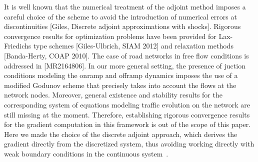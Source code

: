 It is well known that the numerical treatment of the adjoint method imposes a careful choice of the scheme to avoid the introduction of numerical errors  at discontinuities [Giles, Discrete adjoint approximations with shocks].
Rigorous convergence results for optimization problems have been provided  for Lax-Friedichs type schemes [Giles-Ulbrich, SIAM 2012] and relaxation methods [Banda-Herty, COAP 2010].
The case of road networks in free flow conditions is addressed in [MR2164806].
In our more general setting, the presence of juction conditions modeling the onramp and offramp dynamics imposes the use of a modified Godunov scheme that precisely takes into account the flows at the network nodes. Moreover, general existence and stability results for the corresponding system of equations modeling traffic evolution on the network are still missing at the moment.
Therefore, establishing rigorous convergence results for the gradient computation in this framework is out of the scope of this paper. Here we made the choice of the discrete adjoint approach, which derives the gradient directly from the 
discretized system, thus avoiding working directly with weak boundary 
conditions in the continuous 
system~\cite{garavello2006traffic,work2010traffic,strub2006weak}.
 






